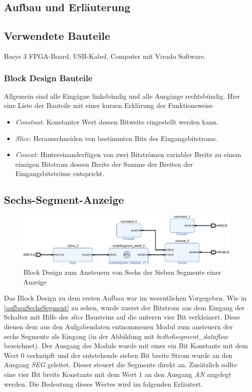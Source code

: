 \documentclass[11pt, a4paper]{article}
\begin{document}
\subsection*{Aufbau und Erläuterung}
\subsection*{Verwendete Bauteile}
Basys 3 FPGA-Board, USB-Kabel, Computer mit Vivado Software.
\subsubsection*{Block Design Bauteile}
Allgemein sind alle Eingägne linksbündig und alle Ausgänge rechtsbündig.
Hier eine Liste der Bauteile mit einer kurzen Erklärung der Funktionsweise
\begin{itemize}	
	\item \textit{Constnat:} Konstanter Wert dessen Bitweite eingestellt werden kann.
	\item \textit{Slice:} Herausschneiden von bestimmten Bits des Eingangsbitstroms.
	\item \textit{Concat:} Hintereinanderfügen von zwei Bitströmen variabler Breite zu einem einzigen Bitstrom dessen Breite der Summe der Breiten der Eingangsbitströme entspricht.
\end{itemize}
\subsection*{Sechs-Segment-Anzeige}
\begin{figure}[htb]    
    \centering
    \includegraphics[width=\linewidth]{versuch1Data/seven_segment_display1.pdf}
    \caption{Block Design zum Ansteuern von Sechs der Sieben Segmente einer Anzeige}
    \label{aufbauSechsSegment}        
\end{figure}
Das Block Design zu dem ersten Aufbau war im wesentlichen Vorgegeben. Wie in \autoref{aufbauSechsSegment} zu sehen, wurde zuerst der Bitstrom aus dem Eingang der Schalter mit Hilfe des \textit{slice} Bausteins auf die unteren vier Bit verkleinert. Diese dienen dem aus den Aufgabendaten entnommenen Modul zum ansteuern der sechs Segmente als Eingang (in der Abbildung mit \textit{bcdto6segment\_dataflow} bezeichnet). Der Ausgang des Moduls wurde mit einer ein Bit Konstante mit dem Wert $0$ verknüpft und der entstehende sieben Bit breite Strom wurde an den Ausgang \textit{SEG} geleitet. Dieser steuert die Segmente direkt an.
Zusätzlich sollte eine vier Bit breite Konstante mit dem Wert $1$ an den Ausgang \textit{AN} angelegt werden. Die Bedeutung dieses Wertes wird im folgenden Erläutert.
\end{document}
